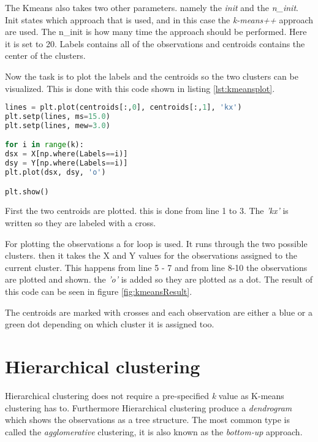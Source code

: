 The Kmeans also takes two other parameters. namely the \emph{init} and the \emph{n\_init}. Init states which approach that is used, and in this case the \emph{k-means++} approach are used. The n\_init is how many time the approach should be performed. Here it is set to 20.
Labels contains all of the observations and centroids contains the center of the clusters.

Now the task is to plot the labels and the centroids so the two clusters can be visualized. 
This is done with this code shown in listing \ref{lst:kmeansplot}.

\begin{lstlisting}[language=Python, label=lst:kmeansplot, caption=The code for plotting the two clusters]
lines = plt.plot(centroids[:,0], centroids[:,1], 'kx')
plt.setp(lines, ms=15.0)
plt.setp(lines, mew=3.0)

for i in range(k):
dsx = X[np.where(Labels==i)]
dsy = Y[np.where(Labels==i)]
plt.plot(dsx, dsy, 'o')

plt.show()
\end{lstlisting}

First the two centroids are plotted. this is done from line 1 to 3. The \emph{'kx'} is written so they are labeled with a cross.

For plotting the observations a for loop is used. It runs through the two possible clusters. then it takes the X and Y values for the observations assigned to the current cluster. This happens from line 5 - 7 and from line 8-10 the observations are plotted and shown. the \emph{'o'} is added so they are plotted as a dot. 
The result of this code can be seen in figure \ref{fig:kmeansResult}.


The centroids are marked with crosses and each observation are either a blue or a green dot depending on which cluster it is assigned too.


\section{Hierarchical clustering}
Hierarchical clustering does not require a pre-specified \emph{k} value as K-means clustering has to.
Furthermore Hierarchical clustering produce a \emph{dendrogram} which shows the observations as a tree structure.
The most common type is called the \emph{agglomerative} clustering, it is also known as the \emph{bottom-up} approach.

